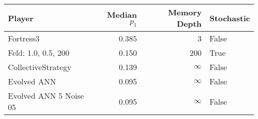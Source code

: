 \begin{tabular}{lrrl}
\toprule
                 Player &  Median $p_1$ &  Memory Depth & Stochastic \\
\midrule
              Fortress3 &         0.385 &             3 &      False \\
    Feld: 1.0, 0.5, 200 &         0.150 &           200 &       True \\
     CollectiveStrategy &         0.139 &            \(\infty\) &      False \\
            Evolved ANN &         0.095 &            \(\infty\) &      False \\
 Evolved ANN 5 Noise 05 &         0.095 &            \(\infty\) &      False \\
\bottomrule
\end{tabular}
